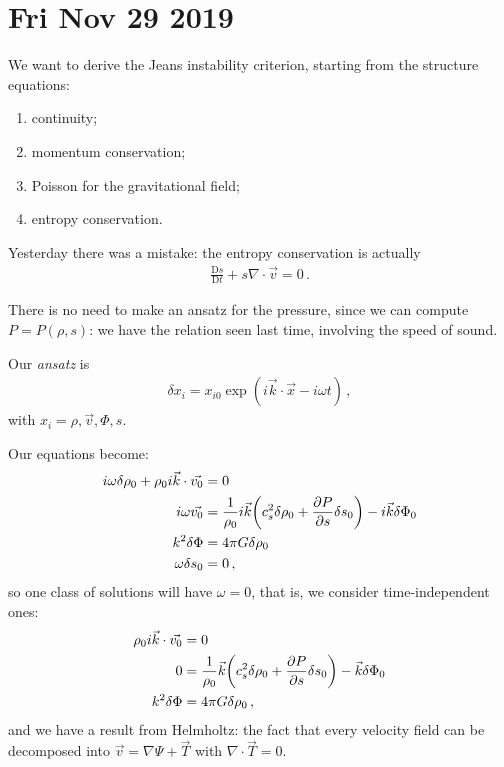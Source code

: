 \documentclass[main.tex]{subfiles}
\begin{document}
\section*{Fri Nov 29 2019}

We want to derive the Jeans instability criterion, starting from the structure equations: 
%
\begin{enumerate}
    \item continuity;
    \item momentum conservation;
    \item Poisson for the gravitational field;
    \item entropy conservation. 
\end{enumerate}

Yesterday there was a mistake: the entropy conservation is actually 
%
\begin{align}
  \frac{\mathrm{D} s}{\mathrm{D} t} + s \nabla \cdot \vec{v} = 0 
\,.
\end{align}
%

There is no need to make an ansatz for the pressure, since we can compute \(P = P (\rho ,s )\): we have the relation seen last time, involving the speed of sound. 

Our \emph{ansatz } is 
%
\begin{align}
  \delta x_i = x_{i0} \exp( i \vec{k} \cdot \vec{x} - i \omega t)
\,,
\end{align}
%
with \(x_{i} = \rho, \vec{v}, \Phi , s\). 

Our equations become: 
%
\begin{align}
  i \omega \delta \rho_0 + \rho_0 i \vec{k} \cdot \vec{v_0} &=0  \\
  i \omega \vec{v_0} &= \frac{1}{\rho_0 } i \vec{k}
  \qty(c^2_s \delta \rho_0 + \pdv{P}{s} \delta s_0 ) 
  - i \vec{k} \delta \Phi_0 \\
  k^2 \delta \Phi &= 4 \pi G \delta \rho_0  \\
  \omega \delta s_0 &= 0
\,,
\end{align}
%
so one class of solutions will have \(\omega = 0\), that is, we consider time-independent ones: 
%
\begin{align}
  \rho_0 i \vec{k} \cdot \vec{v_0} &=0  \\
  0 &= \frac{1}{\rho_0 }  \vec{k}
  \qty(c^2_s \delta \rho_0 + \pdv{P}{s} \delta s_0 ) 
  - \vec{k} \delta \Phi_0 \\
  k^2 \delta \Phi &= 4 \pi G \delta \rho_0  
\,,
\end{align}
%
and we have a result from Helmholtz: the fact that every velocity field can be decomposed into \(\vec{v} = \nabla \Psi + \vec{T}\) with \(\nabla \cdot \vec{T} = 0\). 
\end{document}
